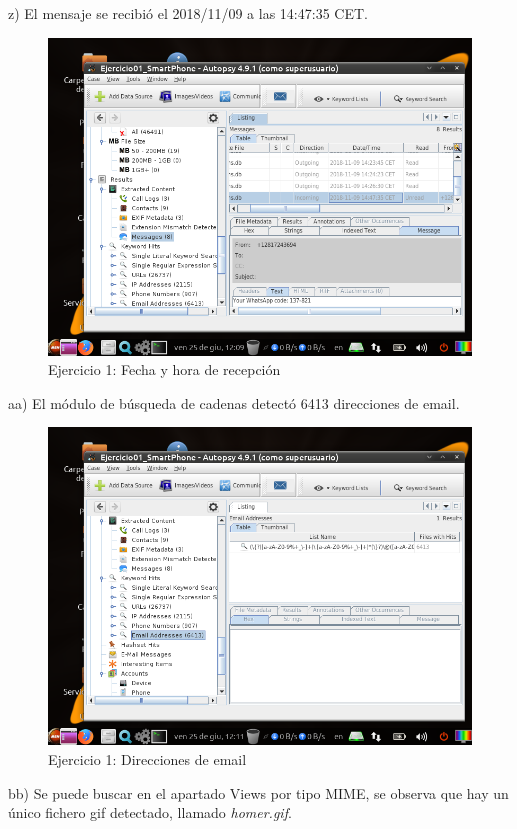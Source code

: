 \documentclass[11pt]{article}
\begin{document}
z) El mensaje se recibió el 2018/11/09 a las 14:47:35 CET.

\begin{figure}[H]
    \caption{Ejercicio 1: Fecha y hora de recepción}
    \centering
    \includegraphics[scale=0.7]{e1-25.png}
\end{figure}

aa) El módulo de búsqueda de cadenas detectó 6413 direcciones de email.

\begin{figure}[H]
    \caption{Ejercicio 1: Direcciones de email}
    \centering
    \includegraphics[scale=0.7]{e1-26.png}
\end{figure}

bb) Se puede buscar en el apartado Views por tipo MIME, se observa que hay un único fichero gif detectado, llamado \textit{homer.gif}.
\end{document}
